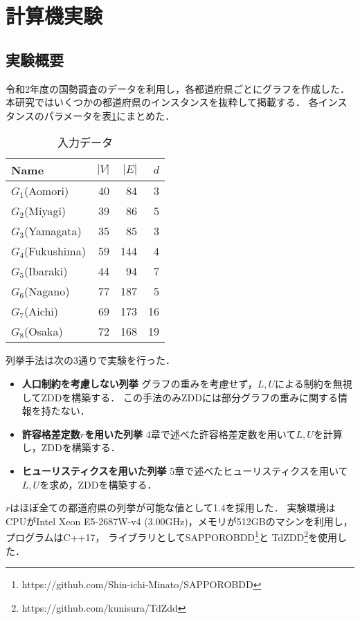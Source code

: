 \documentclass[10pt,a4paper,notitlepage,oneside,twocolumn]{abst_jsarticle}
\begin{document}
\section{計算機実験}
\subsection{実験概要}
令和2年度の国勢調査のデータを利用し，各都道府県ごとにグラフを作成した．
本研究ではいくつかの都道府県のインスタンスを抜粋して掲載する．
各インスタンスのパラメータを表\ref{table:input}にまとめた．

\begin{table}[htbp]
  \small
  \caption{入力データ}
  \label{table:input}
  \centering
  \begin{tabular}{l|rrr}
    \hline
    Name & $|V|$ & $|E|$ & $d$ \\
    \hline\hline
    $G_1$(Aomori) & 40 & 84 & 3 \\
    $G_2$(Miyagi) & 39 & 86 & 5 \\
    $G_3$(Yamagata) & 35 & 85 & 3 \\
    $G_4$(Fukushima) & 59 & 144 & 4 \\
    $G_5$(Ibaraki) & 44 & 94 & 7 \\
    $G_6$(Nagano) & 77 & 187 & 5 \\
    $G_7$(Aichi) & 69 & 173 & 16 \\
    $G_8$(Osaka) & 72 & 168 & 19 \\
    \hline
  \end{tabular}
\end{table}

列挙手法は次の3通りで実験を行った．
\begin{itemize}
  \item \textbf{人口制約を考慮しない列挙} グラフの重みを考慮せず，$L, U$による制約を無視してZDDを構築する．
  この手法のみZDDには部分グラフの重みに関する情報を持たない．
  \item \textbf{許容格差定数$r$を用いた列挙} 4章で述べた許容格差定数を用いて$L, U$を計算し，ZDDを構築する．
  \item \textbf{ヒューリスティクスを用いた列挙} 5章で述べたヒューリスティクスを用いて$L, U$を求め，ZDDを構築する．
\end{itemize}

$r$はほぼ全ての都道府県の列挙が可能な値として1.4を採用した．
実験環境はCPUがIntel Xeon E5-2687W-v4 (3.00GHz)，メモリが512GBのマシンを利用し，プログラムはC++17，
ライブラリとしてSAPPOROBDD\footnote{\scriptsize{https://github.com/Shin-ichi-Minato/SAPPOROBDD}}と
TdZDD\footnote{\scriptsize{https://github.com/kunisura/TdZdd}}を使用した．
\end{document}
